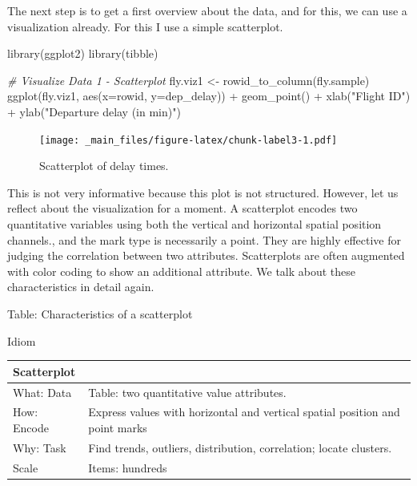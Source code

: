 \documentclass[
]{book}
\newenvironment{Shaded}{\begin{snugshade}}{\end{snugshade}}
\newcommand{\AttributeTok}[1]{\textcolor[rgb]{0.77,0.63,0.00}{#1}}
\newcommand{\CommentTok}[1]{\textcolor[rgb]{0.56,0.35,0.01}{\textit{#1}}}
\newcommand{\FunctionTok}[1]{\textcolor[rgb]{0.00,0.00,0.00}{#1}}
\newcommand{\NormalTok}[1]{#1}
\newcommand{\OtherTok}[1]{\textcolor[rgb]{0.56,0.35,0.01}{#1}}
\newcommand{\SpecialCharTok}[1]{\textcolor[rgb]{0.00,0.00,0.00}{#1}}
\newcommand{\StringTok}[1]{\textcolor[rgb]{0.31,0.60,0.02}{#1}}
\begin{document}
The next step is to get a first overview about the data, and for this, we can use a visualization already. For this I use a simple scatterplot.

\begin{Shaded}
\begin{Highlighting}[]
\FunctionTok{library}\NormalTok{(ggplot2)}
\FunctionTok{library}\NormalTok{(tibble)}

\CommentTok{\# Visualize Data 1 {-} Scatterplot}
\NormalTok{fly.viz1 }\OtherTok{\textless{}{-}} \FunctionTok{rowid\_to\_column}\NormalTok{(fly.sample)}
\FunctionTok{ggplot}\NormalTok{(fly.viz1, }\FunctionTok{aes}\NormalTok{(}\AttributeTok{x=}\NormalTok{rowid, }\AttributeTok{y=}\NormalTok{dep\_delay)) }\SpecialCharTok{+} \FunctionTok{geom\_point}\NormalTok{() }\SpecialCharTok{+} 
  \FunctionTok{xlab}\NormalTok{(}\StringTok{"Flight ID"}\NormalTok{) }\SpecialCharTok{+} \FunctionTok{ylab}\NormalTok{(}\StringTok{"Departure delay (in min)"}\NormalTok{) }
\end{Highlighting}
\end{Shaded}

\begin{figure}
\centering
\texttt{[image: \_main\_files/figure-latex/chunk-label3-1.pdf]}
\caption{\label{fig:chunk-label3}Scatterplot of delay times.}
\end{figure}

This is not very informative because this plot is not structured. However, let us reflect about the visualization for a moment. A scatterplot encodes two quantitative variables using both the vertical and horizontal spatial position channels., and the mark type is necessarily a point. They are highly effective for judging the correlation between two attributes. Scatterplots are often augmented with color coding to show an additional attribute. We talk about these characteristics in detail again.

Table: Characteristics of a scatterplot \citep{munzner2014visualization}

Idiom

\begin{longtable}[]{@{}
  >{\raggedright\arraybackslash}p{}
  >{\raggedright\arraybackslash}p{}@{}}
\toprule
Scatterplot & \\
\midrule
\endhead
What: Data & Table: two quantitative value attributes. \\
How: Encode & Express values with horizontal and vertical spatial position and point marks \\
Why: Task & Find trends, outliers, distribution, correlation; locate clusters. \\
Scale & Items: hundreds \\
\bottomrule
\end{longtable}
\end{document}
